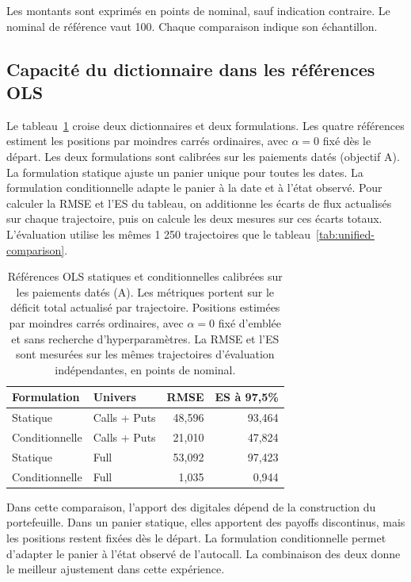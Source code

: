 \documentclass[12pt,a4paper]{article}
\newcommand{\1}{\mathbf{1}}
\begin{document}
Les montants sont exprimés en points de nominal, sauf indication contraire. Le nominal de référence vaut 100. Chaque comparaison indique son échantillon.

\subsection{Capacité du dictionnaire dans les références OLS}

Le tableau~\ref{tab:ols-capacity} croise deux dictionnaires et deux formulations. Les quatre références estiment les positions par moindres carrés ordinaires, avec $\alpha=0$ fixé dès le départ. Les deux formulations sont calibrées sur les paiements datés (objectif A). La formulation statique ajuste un panier unique pour toutes les dates. La formulation conditionnelle adapte le panier à la date et à l'état observé. Pour calculer la RMSE et l'ES du tableau, on additionne les écarts de flux actualisés sur chaque trajectoire, puis on calcule les deux mesures sur ces écarts totaux. L'évaluation utilise les mêmes 1 250 trajectoires que le tableau~\ref{tab:unified-comparison}.

\begin{table}[htbp]
\centering
\small
\begin{tabular}{llrr}
\toprule
Formulation & Univers & RMSE & ES à 97,5\% \\
\midrule
Statique & Calls + Puts & 48,596 & 93,464 \\
Conditionnelle & Calls + Puts & 21,010 & 47,824 \\
Statique & Full & 53,092 & 97,423 \\
Conditionnelle & Full & 1,035 & 0,944 \\
\bottomrule
\end{tabular}
\caption{Références OLS statiques et conditionnelles calibrées sur les paiements datés (A). Les métriques portent sur le déficit total actualisé par trajectoire. Positions estimées par moindres carrés ordinaires, avec $\alpha=0$ fixé d'emblée et sans recherche d'hyperparamètres. La RMSE et l'ES sont mesurées sur les mêmes trajectoires d'évaluation indépendantes, en points de nominal.}
\label{tab:ols-capacity}
\end{table}

Dans cette comparaison, l'apport des digitales dépend de la construction du portefeuille. Dans un panier statique, elles apportent des payoffs discontinus, mais les positions restent fixées dès le départ. La formulation conditionnelle permet d'adapter le panier à l'état observé de l'autocall. La combinaison des deux donne le meilleur ajustement dans cette expérience.
\end{document}
